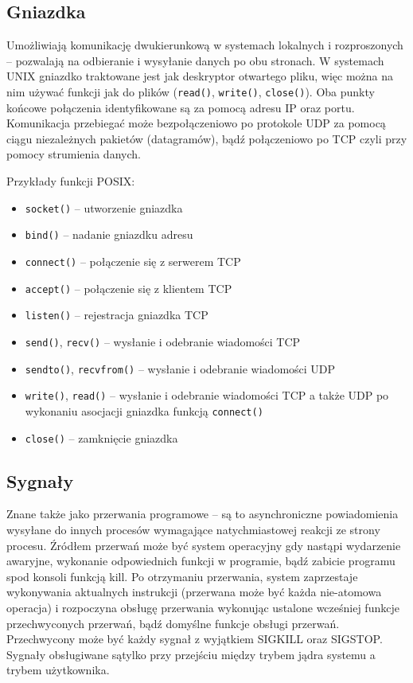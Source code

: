 \subsection{Gniazdka}

Umożliwiają komunikację dwukierunkową w systemach lokalnych i rozproszonych -- pozwalają na odbieranie i wysyłanie danych po obu stronach. W systemach UNIX gniazdko traktowane jest jak deskryptor otwartego pliku, więc można na nim używać funkcji jak do plików (\texttt{read()}, \texttt{write()}, \texttt{close()}). Oba punkty końcowe połączenia identyfikowane są za pomocą adresu IP oraz portu. Komunikacja przebiegać może bezpołączeniowo po protokole UDP za pomocą ciągu niezależnych pakietów (datagramów), bądź połączeniowo po TCP czyli przy pomocy strumienia danych.

Przykłady funkcji POSIX:
\begin{itemize}
	\item \texttt{socket()} -- utworzenie gniazdka
    \item \texttt{bind()} -- nadanie gniazdku adresu
    \item \texttt{connect()} -- połączenie się z serwerem TCP
    \item \texttt{accept()} -- połączenie się z klientem TCP
    \item \texttt{listen()} -- rejestracja gniazdka TCP
    \item \texttt{send()}, \texttt{recv()} -- wysłanie i odebranie wiadomości TCP
    \item \texttt{sendto()}, \texttt{recvfrom()} -- wysłanie i odebranie wiadomości UDP 
    \item \texttt{write()}, \texttt{read()} -- wysłanie i odebranie wiadomości TCP a także UDP po wykonaniu asocjacji gniazdka funkcją \texttt{connect()}
    \item \texttt{close()} -- zamknięcie gniazdka
\end{itemize}

\subsection{Sygnały}

Znane także jako przerwania programowe -- są to asynchroniczne powiadomienia wysyłane do innych procesów wymagające natychmiastowej reakcji ze strony procesu. Źródłem przerwań może być system operacyjny gdy nastąpi wydarzenie awaryjne, wykonanie odpowiednich funkcji w programie, bądź zabicie programu spod konsoli funkcją kill. Po otrzymaniu przerwania, system zaprzestaje wykonywania aktualnych instrukcji (przerwana może być każda nie-atomowa operacja) i rozpoczyna obsługę przerwania wykonując ustalone wcześniej funkcje przechwyconych przerwań, bądź domyślne funkcje obsługi przerwań. Przechwycony może być każdy sygnał z wyjątkiem SIGKILL oraz SIGSTOP. Sygnały obsługiwane sątylko przy przejściu między trybem jądra systemu a trybem użytkownika.

